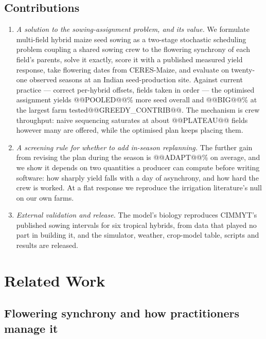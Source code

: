 \documentclass[10pt,twocolumn]{article}
\begin{document}
\subsection{Contributions}

\begin{enumerate}
\itemsep1pt
\item \emph{A solution to the sowing-assignment problem, and its value.} We
formulate multi-field hybrid maize seed sowing as a two-stage stochastic
scheduling problem coupling a shared sowing crew to the flowering synchrony
of each field's parents, solve it exactly, score it with a published
measured yield response, take flowering dates from CERES-Maize, and
evaluate on twenty-one observed seasons at an Indian seed-production site.
Against current practice --- correct per-hybrid offsets, fields taken in
order --- the optimised assignment yields @@POOLED@@\% more seed overall and
@@BIG@@\% at the largest farm tested@@GREEDY_CONTRIB@@. The mechanism is crew
throughput: naive sequencing saturates at about @@PLATEAU@@ fields however
many are offered, while the optimised plan keeps placing them.
\item \emph{A screening rule for whether to add in-season replanning.} The
further gain from revising the plan during the season is @@ADAPT@@\% on
average, and we show it depends on two quantities a producer can compute
before writing software: how sharply yield falls with a day of asynchrony,
and how hard the crew is worked. At a flat response we reproduce the
irrigation literature's null on our own farms.
\item \emph{External validation and release.} The model's biology
reproduces CIMMYT's published sowing intervals for six tropical hybrids,
from data that played no part in building it, and the simulator, weather,
crop-model table, scripts and results are released.
\end{enumerate}

\section{Related Work}
\label{sec:related}

\subsection{Flowering synchrony and how practitioners manage it}
\end{document}
